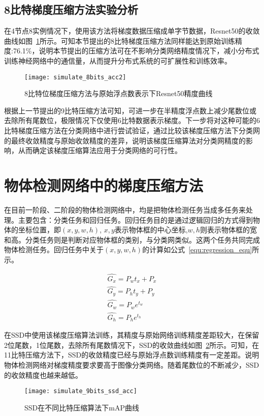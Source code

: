 \subsection{8比特梯度压缩方法实验分析}
在4节点8实例情况下，使用该方法将梯度数据压缩成单字节数据，Resnet50的收敛曲线如图~\ref{fig:simulate_8bits_acc}所示。可知本节提出的8比特梯度压缩方法同样能达到原始训练精度:76.1\%，说明本节提出的压缩方法可在不影响分类网络精度情况下，减小分布式训练神经网络中的通信量，从而提升分布式系统的可扩展性和训练效率。
\begin{figure}[htp]
\centering
\texttt{[image: simulate\_8bits\_acc2]}
\caption{8比特位梯度压缩方法与原始浮点数表示下Resnet50精度曲线}
\label{fig:simulate_8bits_acc}
\end{figure}

根据上一节提出的9比特压缩方法可知，可进一步在半精度浮点数上减少尾数位或去除所有尾数位，极限情况下仅使用6比特数据表示梯度。下一步将对这种可能的6比特梯度压缩方法在分类网络中进行尝试验证，通过比较该梯度压缩方法下分类网的最终收敛精度与原始收敛精度的差异，说明该梯度压缩算法对分类网精度的影响，从而确定该梯度压缩算法应用于分类网络的可行性。

\section{物体检测网络中的梯度压缩方法}

在目前一阶段、二阶段的物体检测网络中，均是把物体检测任务当成多任务来处理。主要包含：分类任务和回归任务。回归任务目的是通过逻辑回归的方式得到物体的坐标位置，即$(x,y,w,h)$, $x,y$表示物体框的中心坐标,$w,h$则表示物体框的宽和高。分类任务则是判断对应物体框的类别，与分类网类似。这两个任务共同完成物体检测任务。回归任务中关于$(x,y,w,h)$的计算如公式~\ref{equ:regression_equ}所示。

\begin{equation}
\label{equ:regression_equ}
\begin{split}
\hat{G_{x}}=P_{w}t_{x}+P_{x} \\
\hat{G_{y}}=P_{h}t_{y}+P_{y} \\
\hat{G_{w}}=P_{w}e^{t_{w}} \\
\hat{G_{h}}=P_{h}e^{t_{h}} 
\end{split}
\end{equation}


在SSD中使用该梯度压缩算法训练，其精度与原始网络训练精度差距较大，在保留2位尾数，1位尾数，去除所有尾数情况下，SSD的收敛曲线如图~\ref{fig:simulate_9bits_ssd_acc}所示。可知，在11比特压缩方法下，SSD的收敛精度已经与原始浮点数训练精度有一定差距。说明物体检测网络对梯度精度要求要高于图像分类网络。随着尾数位的不断减少，SSD的收敛精度也越来越低。
\begin{figure}[htp]
\centering
\texttt{[image: simulate\_9bits\_ssd\_acc]}
\caption{SSD在不同比特压缩算法下mAP曲线}
\label{fig:simulate_9bits_ssd_acc}
\end{figure}

